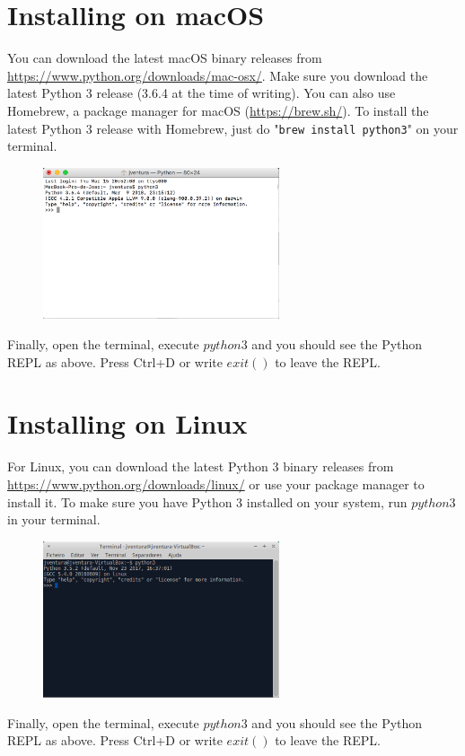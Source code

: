 \section{Installing on macOS}

You can download the latest macOS binary releases from \url{https://www.python.org/downloads/mac-osx/}. Make sure you download the latest Python 3 release (3.6.4 at the time of writing). You can also use Homebrew, a package manager for macOS (\url{https://brew.sh/}). To install the latest Python 3 release with Homebrew, just do "\texttt{brew install python3}" on your terminal.

\begin{figure}[H]
	\centering
  	\includegraphics[width=0.62\textwidth]{images/python_macos.png}
\end{figure}

Finally, open the terminal, execute $python3$ and you should see the Python REPL as above. Press Ctrl+D or write $exit()$ to leave the REPL.

\section{Installing on Linux}

For Linux, you can download the latest Python 3 binary releases from \url{https://www.python.org/downloads/linux/} or use your package manager to install it. To make sure you have Python 3 installed on your system, run $python3$ in your terminal.

\begin{figure}[H]
	\centering
  	\includegraphics[width=0.62\textwidth]{images/python_linux.png}
\end{figure}

Finally, open the terminal, execute $python3$ and you should see the Python REPL as above. Press Ctrl+D or write $exit()$ to leave the REPL.
